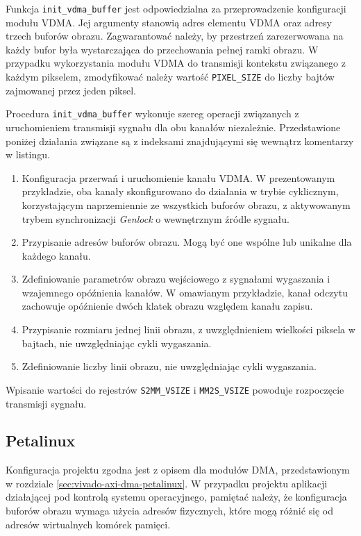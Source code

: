 Funkcja \texttt{init\_vdma\_buffer} jest odpowiedzialna za przeprowadzenie konfiguracji modułu VDMA. 
Jej argumenty stanowią adres elementu VDMA oraz adresy trzech buforów obrazu. 
Zagwarantować należy, by przestrzeń zarezerwowana na każdy bufor była wystarczająca do przechowania pełnej ramki obrazu. 
W przypadku wykorzystania modułu VDMA do transmisji kontekstu związanego z każdym pikselem, zmodyfikować należy wartość \texttt{PIXEL\_SIZE} do liczby bajtów zajmowanej przez jeden piksel.

Procedura \texttt{init\_vdma\_buffer} wykonuje szereg operacji związanych z uruchomieniem transmisji sygnału dla obu kanałów niezależnie.
Przedstawione poniżej działania związane są z indeksami znajdującymi się wewnątrz komentarzy w listingu.
\begin{enumerate}
	\item Konfiguracja przerwań i uruchomienie kanału VDMA.
	W prezentowanym przykładzie, oba kanały skonfigurowano do działania w trybie cyklicznym, korzystającym naprzemiennie ze wszystkich buforów obrazu, z aktywowanym trybem synchronizacji \emph{Genlock} o wewnętrznym źródle sygnału.
	
	\item Przypisanie adresów buforów obrazu. Mogą być one wspólne lub unikalne dla każdego kanału.
	
	\item Zdefiniowanie parametrów obrazu wejściowego z sygnałami wygaszania i wzajemnego opóźnienia kanałów.
	W omawianym przykładzie, kanał odczytu zachowuje opóźnienie dwóch klatek obrazu względem kanału zapisu.
	
	\item Przypisanie rozmiaru jednej linii obrazu, z uwzględnieniem wielkości piksela w bajtach, nie uwzględniając cykli wygaszania.
	
	\item Zdefiniowanie liczby linii obrazu, nie uwzględniając cykli wygaszania.
\end{enumerate}

Wpisanie wartości do rejestrów \texttt{S2MM\_VSIZE} i \texttt{MM2S\_VSIZE} powoduje rozpoczęcie transmisji sygnału.

\subsection{Petalinux}
Konfiguracja projektu zgodna jest z opisem dla modułów DMA, przedstawionym w rozdziale \ref{sec:vivado-axi-dma-petalinux}. 
W przypadku projektu aplikacji działającej pod kontrolą systemu operacyjnego, pamiętać należy, że konfiguracja buforów obrazu wymaga użycia adresów fizycznych, które mogą różnić się od adresów wirtualnych komórek pamięci.

